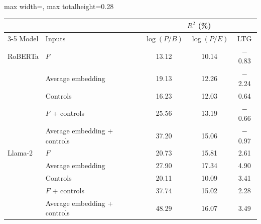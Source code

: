 \begin{table}[htbp]
{\begin{adjustbox}{max width=\linewidth, max totalheight=0.28\textheight}
\begin{tabular}{llccc}
\toprule
\multicolumn{2}{c}{} & \multicolumn{3}{c}{$R^2$ (\%)} \\
\cmidrule(lr){3-5}
Model & Inputs & $\log(P/B)$ & $\log(P/E)$ & LTG \\
\midrule
RoBERTa & $F$ & 13.12 & 10.14 & $-$0.83 \\
 & Average embedding & 19.13 & 12.26 & $-$2.24 \\
 & Controls & 16.23 & 12.03 & \phantom{$-$}0.64 \\
 & $F$ + controls & 25.56 & 13.19 & $-$0.66 \\
 & Average embedding + controls & 37.20 & 15.06 & $-$0.97 \\
\midrule
Llama-2 & $F$ & 20.73 & 15.81 & \phantom{$-$}2.61 \\
 & Average embedding & 27.90 & 17.34 & \phantom{$-$}4.90 \\
 & Controls & 20.11 & 10.09 & \phantom{$-$}3.41 \\
 & $F$ + controls & 37.74 & 15.02 & \phantom{$-$}2.28 \\
 & Average embedding + controls & 48.29 & 16.07 & \phantom{$-$}3.49 \\
\bottomrule
\end{tabular}
\end{adjustbox}
}
\end{table}
